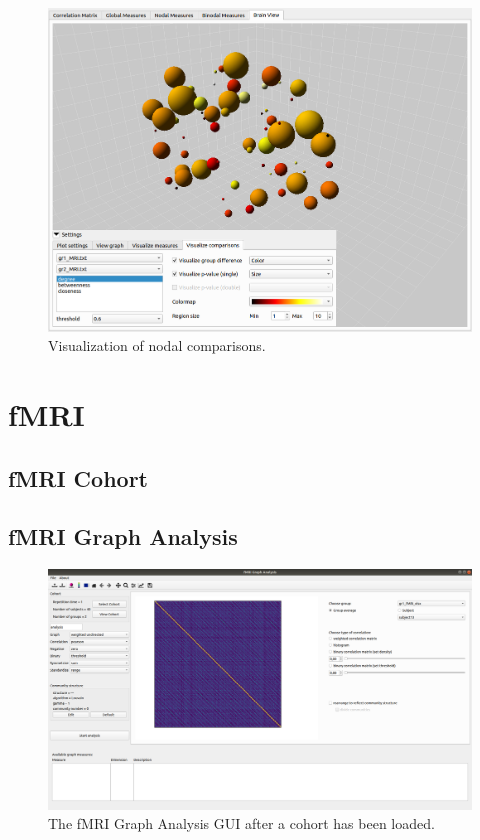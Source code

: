\documentclass{article}
\begin{document}
\begin{figure}[h]
    \centering
    \includegraphics[width=\linewidth]{comparison_vis.png}
    \caption{Visualization of nodal comparisons.}
    \label{fig:comparison_vis}
\end{figure}

\section{fMRI}

\subsection{fMRI Cohort}

\subsection{fMRI Graph Analysis}

\begin{figure}[h]
    \centering
    \includegraphics[width=\linewidth]{fmri_ga.png}
    \caption{The fMRI Graph Analysis GUI after a cohort has been loaded.}
    \label{fig:fmri_ga}
\end{figure}
\end{document}
